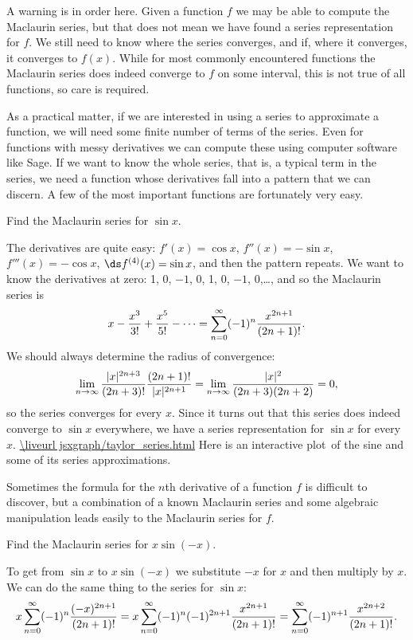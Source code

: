 A warning is in order here. Given a function $f$ we may be able to
compute the Maclaurin series, but that does not mean we have found a
series representation for $f$. We still need to know where the series
converges, and if, where it converges, it converges to $f(x)$. While
for most commonly encountered functions the Maclaurin series does
indeed converge to $f$ on some interval, this is not true of all
functions, so care is required.

As a practical matter, if we are interested in using a series to
approximate a function, we will need some finite number of terms of
the series. Even for functions with messy derivatives we can compute
these using computer software like Sage. If we want to
know the whole series, that is, a typical term in the series, we need
a function whose derivatives fall into a pattern that we can
discern. A few of the most important functions are fortunately very
easy.

\begin{example} Find the Maclaurin series for $\sin x$.

The derivatives are quite easy: $f'(x)=\cos x$, $f''(x)=-\sin x$,
$f'''(x)=-\cos x$, $\ds f^{(4)}(x)=\sin x$, and then the pattern
repeats. We want to know the derivatives at zero:
1, 0, $-1$, 0, 1, 0, $-1$, 0,\dots, and so the Maclaurin series is
$$
  x-{x^3\over 3!}+{x^5\over 5!}-\cdots=
  \sum_{n=0}^\infty (-1)^n{x^{2n+1}\over (2n+1)!}.
$$
We should always determine the radius of convergence:
$$
  \lim_{n\to\infty} {|x|^{2n+3}\over (2n+3)!}{(2n+1)!\over |x|^{2n+1}}
  =\lim_{n\to\infty} {|x|^2\over (2n+3)(2n+2)}=0,
$$
so the series converges for every $x$. Since it turns out that this
series does indeed converge to $\sin x$ everywhere, we have a series
representation for $\sin x$ for every $x$. 
\expandafter\url\expandafter{\liveurl jsxgraph/taylor_series.html}%
Here is an interactive plot\endurl\ of the sine and some of its 
series approximations.
\end{example}

Sometimes the formula for the $n$th derivative of a function $f$ is
difficult to discover, but a combination of a known Maclaurin series
and some algebraic manipulation leads easily to the Maclaurin series
for $f$.

\begin{example} Find the Maclaurin series for $x\sin(-x)$.

To get from $\sin x$ to $x\sin(-x)$ we substitute $-x$ for $x$ and
then multiply by $x$. We can do the same thing to the series for $\sin
x$:
$$
  x\sum_{n=0}^\infty (-1)^n{(-x)^{2n+1}\over (2n+1)!}
  =x\sum_{n=0}^\infty (-1)^{n}(-1)^{2n+1}{x^{2n+1}\over (2n+1)!}
  =\sum_{n=0}^\infty (-1)^{n+1}{x^{2n+2}\over (2n+1)!}.
$$
\end{example}


